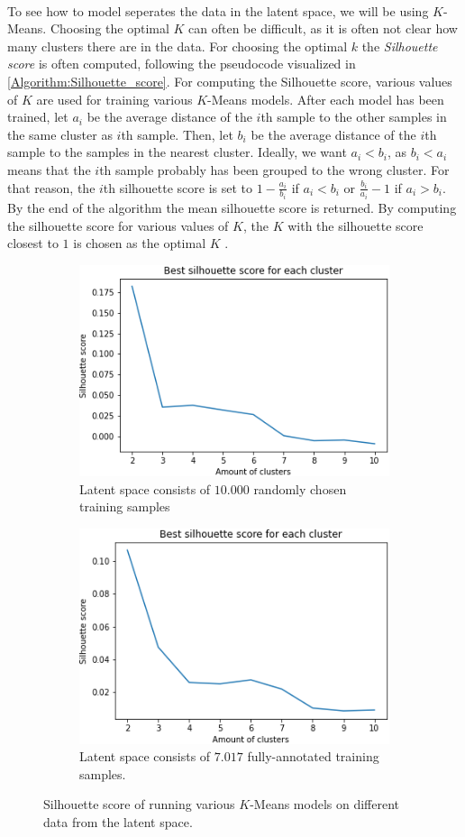\documentclass[./main.tex]{subfiles}
\begin{document}
\\
To see how to model seperates the data in the latent space, we will be using $K$-Means. Choosing the optimal $K$ can often be difficult, as it is often not clear how many clusters there are in the data. For choosing the optimal $k$ the \textit{Silhouette score} is often computed, following the pseudocode visualized in \ref{Algorithm:Silhouette_score}. For computing the Silhouette score, various values of $K$ are used for training various $K$-Means models. After each model has been trained, let $a_i$ be the average distance of the $i$th sample to the other samples in the same cluster as $i$th sample. Then, let $b_i$ be the average distance of the $i$th sample to the samples in the nearest cluster. Ideally, we want $a_i < b_i$, as $b_i < a_i$ means that the $i$th sample probably has been grouped to the wrong cluster. For that reason, the $i$th silhouette score is set to $1 - \frac{a_i}{b_i}$ if $a_i < b_i$ or $\frac{b_i}{a_i} - 1$ if $a_i > b_i$. By the end of the algorithm the mean silhouette score is returned. By computing the silhouette score for various values of $K$, the $K$ with the silhouette score closest to $1$ is chosen as the optimal $K$ \cite{MAD_L12}.
\\
\begin{figure}[b]
    \centering
    \begin{subfigure}{7 cm}
        \centering
        \includegraphics[width = 7 cm]{entities/silhouette_score_all_skeletons.png}
        \caption{Latent space consists of $10.000$ randomly chosen training samples}
        \label{fig:silhouette_all}
    \end{subfigure}
    \begin{subfigure}{7 cm}
        \centering
        \includegraphics[width = 7 cm]{entities/silhouette_score_full_skeletons.png}
        \caption{Latent space consists of $7.017$ fully-annotated training samples.}
        \label{fig:silhouette_full}
    \end{subfigure}
    \caption{Silhouette score of running various $K$-Means models on different data from the latent space.}
\end{figure}
\end{document}
